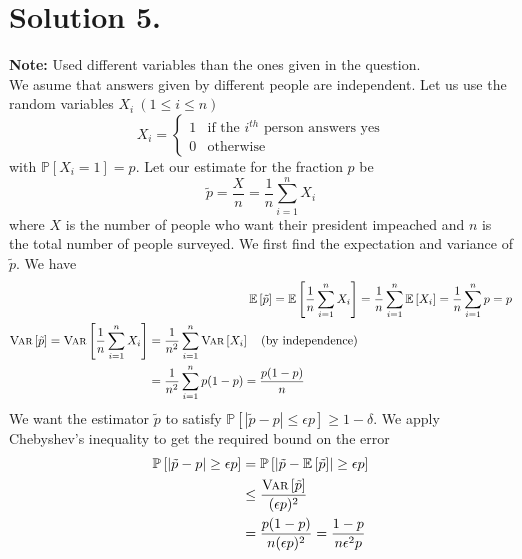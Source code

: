 \documentclass[9pt]{article}
\newcommand{\Probability}[1]{\mathbb{P}\left[ #1 \right]}
\newcommand{\Expectation}[1]{\mathbb{E}\left[ #1 \right]}
\newcommand{\Variance}[1]{\textsc{Var}\left[ #1 \right]}
\begin{document}
\section*{\textbf{Solution 5.}}
\textbf{Note:} Used different variables than the ones given in the question.
\vspace*{7pt} \\
We asume that answers given by different people are independent. Let us use the random
variables $X_{i} \ (1 \leq i \leq n)$
\begin{equation}
    X_{i} = \begin{cases}
        1 & \text{if the } i^{th} \text{ person answers yes} \\
        0 & \text{otherwise}
    \end{cases}
\end{equation}
with $\Probability{X_{i} = 1} = p$. Let our estimate for the fraction $p$ be
\begin{equation}
    \tilde{p} = \frac{X}{n} = \frac{1}{n} \sum_{i=1}^{n} X_{i}
\end{equation}
where $X$ is the number of people who want their president impeached and $n$ is the
total number of people surveyed. We first find the expectation and variance
of $\tilde{p}$. We have
\begin{align}
    \Expectation{\tilde{p}} = \Expectation{\frac{1}{n} \sum_{i=1}^{n} X_{i}}
    &= \frac{1}{n} \sum_{i=1}^{n} \Expectation{X_{i}}
    = \frac{1}{n} \sum_{i=1}^{n} p = p \\
    \begin{split}
        \Variance{\tilde{p}} = \Variance{\frac{1}{n} \sum_{i=1}^{n} X_{i}}
        &= \frac{1}{n^{2}} \sum_{i=1}^{n} \Variance{X_{i}}
        \quad \text{(by independence)} \\
        &= \frac{1}{n^{2}} \sum_{i=1}^{n} p(1-p) = \frac{p(1-p)}{n}
    \end{split}
\end{align}
We want the estimator $\tilde{p}$ to satisfy $\Probability{\left| \tilde{p} - p \right| \leq \epsilon p} \geq 1 - \delta$.
We apply Chebyshev's inequality to get the required bound on the error
\begin{align}
    \begin{split}
        \Probability{\left| \tilde{p} - p \right| \geq \epsilon p}
        &= \Probability{\left| \tilde{p} - \Expectation{\tilde{p}} \right| \geq \epsilon p} \\
        &\leq \frac{\Variance{\tilde{p}}}{(\epsilon p)^{2}} \\
        &= \frac{p(1-p)}{n (\epsilon p)^{2}}
        = \frac{1-p}{n \epsilon^{2} p}
    \end{split}
\end{align}
\end{document}
